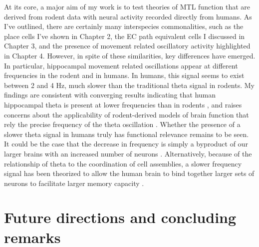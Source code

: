 At its core, a major aim of my work is to test theories of MTL function that are derived from rodent data with neural activity recorded directly from humans. As I've outlined, there are certainly many interspecies commonalities, such as the place cells I've shown in Chapter 2, the EC path equivalent cells I discussed in Chapter 3, and the presence of movement related oscillatory activity highlighted in Chapter 4. However, in spite of these similarities, key differences have emerged. In particular, hippocampal movement related oscillations appear at different frequencies in the rodent and in humans. In humans, this signal seems to exist between 2 and 4 Hz, much slower than the traditional theta signal in rodents. My findings are consistent with converging results indicating that human hippocampal theta is present at lower frequencies than in rodents \citep{WatrEtal13a,Jaco14}, and raises concerns about the applicability of rodent-derived models of brain function that rely the precise frequency of the theta oscillation \citep{JensLism98,BurgEtal07}. Whether the presence of a slower theta signal in humans truly has functional relevance remains to be seen. It could be the case that the decrease in frequency is simply a byproduct of our larger brains with an increased number of neurons \citep{BuzsDrag04}. Alternatively, because of the relationship of theta to the coordination of cell assemblies, a slower frequency signal has been theorized to allow the human brain to bind together larger sets of neurons to facilitate larger memory capacity \citep{Jaco14}.










% 

\section{Future directions and concluding remarks}

